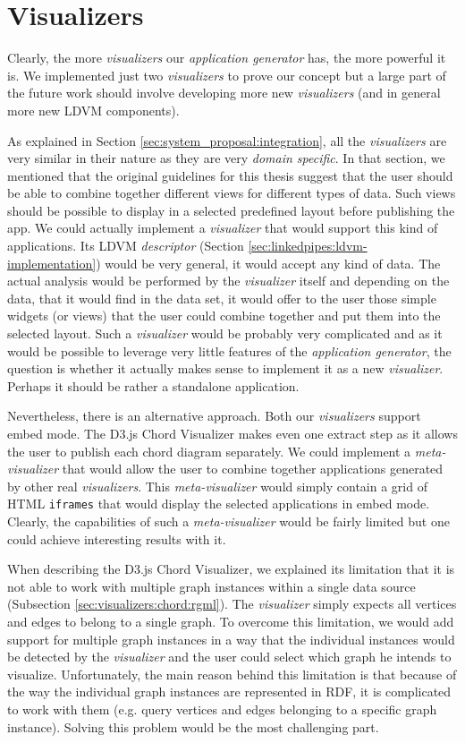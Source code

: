 \section{Visualizers}

Clearly, the more \emph{visualizers} our \emph{application generator} has, the more powerful it is. We implemented just two \emph{visualizers} to prove our concept but a large part of the future work should involve developing more new \emph{visualizers} (and in general more new LDVM components).

As explained in Section \ref{sec:system_proposal:integration}, all the \emph{visualizers} are very similar in their nature as they are very \emph{domain specific}. In that section, we mentioned that the original guidelines for this thesis suggest that the user should be able to combine together different views for different types of data. Such views should be possible to display in a selected predefined layout before publishing the app. We could actually implement a \emph{visualizer} that would support this kind of applications. Its LDVM \emph{descriptor} (Section \ref{sec:linkedpipes:ldvm-implementation}) would be very general, it would accept any kind of data. The actual analysis would be performed by the \emph{visualizer} itself and depending on the data, that it would find in the data set, it would offer to the user those simple widgets (or views) that the user could combine together and put them into the selected layout. Such a \emph{visualizer} would be probably very complicated and as it would be possible to leverage very little features of the \emph{application generator}, the question is whether it actually makes sense to implement it as a new \emph{visualizer}. Perhaps it should be rather a standalone application.

Nevertheless, there is an alternative approach. Both our \emph{visualizers} support embed mode. The D3.js Chord Visualizer makes even one extract step as it allows the user to publish each chord diagram separately. We could implement a \emph{meta-visualizer} that would allow the user to combine together applications generated by other real \emph{visualizers}. This \emph{meta-visualizer} would simply contain a grid of HTML \texttt{iframes} that would display the selected applications in embed mode. Clearly, the capabilities of such a \emph{meta-visualizer} would be fairly limited but one could achieve interesting results with it.

When describing the D3.js Chord Visualizer, we explained its limitation that it is not able to work with multiple graph instances within a single data source (Subsection \ref{sec:visualizers:chord:rgml}). The \emph{visualizer} simply expects all vertices and edges to belong to a single graph. To overcome this limitation, we would add support for multiple graph instances in a way that the individual instances would be detected by the \emph{visualizer} and the user could select which graph he intends to visualize. Unfortunately, the main reason behind this limitation is that because of the way the individual graph instances are represented in RDF, it is complicated to work with them (e.g. query vertices and edges belonging to a specific graph instance). Solving this problem would be the most challenging part.

